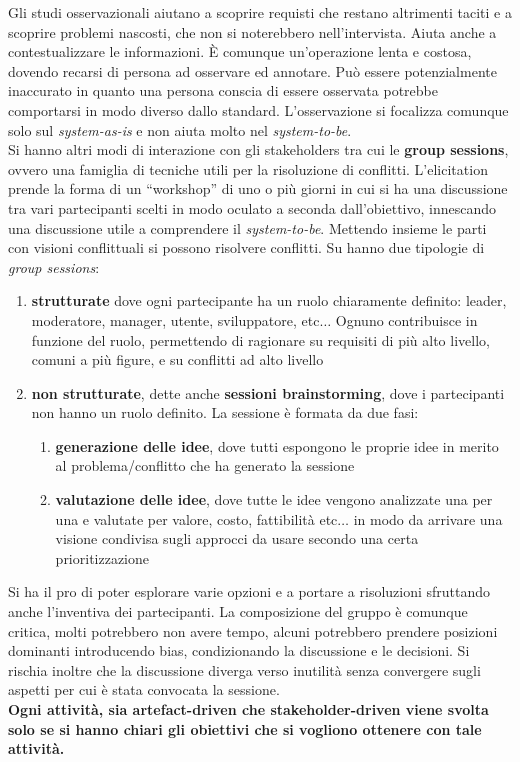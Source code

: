 \documentclass[a4paper,12pt, oneside]{book}
\begin{document}
Gli studi osservazionali aiutano a scoprire requisti che restano altrimenti
taciti e a scoprire problemi nascosti, che non si noterebbero
nell'intervista. Aiuta anche a contestualizzare le informazioni. È comunque
un'operazione lenta e costosa, dovendo recarsi di persona ad osservare ed
annotare. Può essere potenzialmente inaccurato in quanto una persona conscia di
essere osservata potrebbe comportarsi in modo diverso dallo
standard. L'osservazione si focalizza comunque solo sul \textit{system-as-is} e
non aiuta molto nel \textit{system-to-be}.\\
Si hanno altri modi di interazione con gli stakeholders tra cui le \textbf{group
sessions}, ovvero una famiglia di tecniche utili per la risoluzione di
conflitti. L'elicitation prende la forma di un ``workshop'' di uno o più giorni
in cui si ha una discussione tra vari partecipanti scelti in modo oculato a
seconda dall'obiettivo, innescando una discussione utile a comprendere il
\textit{system-to-be}. Mettendo insieme le parti con visioni conflittuali si
possono risolvere conflitti. Su hanno due tipologie di \textit{group sessions}:
\begin{enumerate}
  \item \textbf{strutturate} dove ogni partecipante ha un ruolo chiaramente
  definito: leader, moderatore, manager, utente, sviluppatore, etc$\ldots$
  Ognuno contribuisce in funzione del ruolo, permettendo di ragionare su
  requisiti di più alto livello, comuni a più figure, e su conflitti ad alto
  livello 
  \item \textbf{non strutturate}, dette anche \textbf{sessioni brainstorming},
  dove i partecipanti non hanno un ruolo definito. La sessione è formata da due
  fasi:
  \begin{enumerate}
    \item \textbf{generazione delle idee}, dove tutti espongono le proprie idee
    in merito al problema/conflitto che ha generato la sessione
    \item \textbf{valutazione delle idee}, dove tutte le idee vengono
    analizzate una per una e valutate per valore, costo, fattibilità etc$\ldots$
    in modo da arrivare una visione condivisa sugli approcci da usare secondo
    una certa prioritizzazione
  \end{enumerate}
\end{enumerate}
Si ha il pro di poter esplorare varie opzioni e a portare a risoluzioni
sfruttando anche l'inventiva dei partecipanti. La composizione del gruppo è
comunque critica, molti potrebbero non avere tempo, alcuni potrebbero prendere
posizioni dominanti introducendo bias, condizionando la discussione e le
decisioni. Si rischia inoltre che la discussione diverga verso inutilità senza
convergere sugli aspetti per cui è stata convocata la sessione.\\
\textbf{Ogni attività, sia artefact-driven che stakeholder-driven viene svolta
  solo se si hanno chiari gli obiettivi che si vogliono ottenere con tale
  attività.}
\newpage
\end{document}

